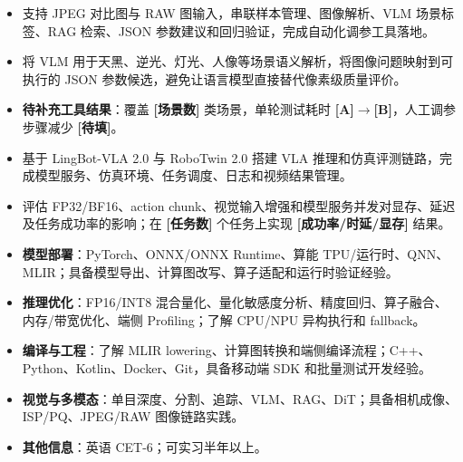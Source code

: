 \begin{itemize}
  \item 支持 JPEG 对比图与 RAW 图输入，串联样本管理、图像解析、VLM 场景标签、RAG 检索、JSON 参数建议和回归验证，完成自动化调参工具落地。
  \item 将 VLM 用于天黑、逆光、灯光、人像等场景语义解析，将图像问题映射到可执行的 JSON 参数候选，避免让语言模型直接替代像素级质量评价。
  \item \textbf{待补充工具结果}：覆盖 \textbf{[场景数]} 类场景，单轮测试耗时 \textbf{[A]}$\rightarrow$\textbf{[B]}，人工调参步骤减少 \textbf{[待填]}。
\end{itemize}

\begin{itemize}
  \item 基于 LingBot-VLA 2.0 与 RoboTwin 2.0 搭建 VLA 推理和仿真评测链路，完成模型服务、仿真环境、任务调度、日志和视频结果管理。
  \item 评估 FP32/BF16、action chunk、视觉输入增强和模型服务并发对显存、延迟及任务成功率的影响；在 \textbf{[任务数]} 个任务上实现 \textbf{[成功率/时延/显存]} 结果。
\end{itemize}

\begin{itemize}
  \item \textbf{模型部署}：PyTorch、ONNX/ONNX Runtime、算能 TPU/运行时、QNN、MLIR；具备模型导出、计算图改写、算子适配和运行时验证经验。
  \item \textbf{推理优化}：FP16/INT8 混合量化、量化敏感度分析、精度回归、算子融合、内存/带宽优化、端侧 Profiling；了解 CPU/NPU 异构执行和 fallback。
  \item \textbf{编译与工程}：了解 MLIR lowering、计算图转换和端侧编译流程；C++、Python、Kotlin、Docker、Git，具备移动端 SDK 和批量测试开发经验。
  \item \textbf{视觉与多模态}：单目深度、分割、追踪、VLM、RAG、DiT；具备相机成像、ISP/PQ、JPEG/RAW 图像链路实践。
  \item \textbf{其他信息}：英语 CET-6；可实习半年以上。
\end{itemize}
